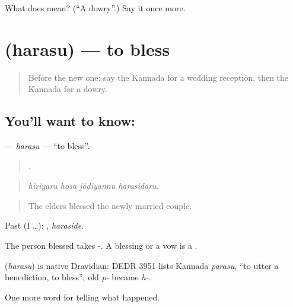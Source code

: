 \begin{tcolorbox}[breakable,colback=teal!4,colframe=teal!35!black,title={Before you move on}]
What does  mean? (\textquotedblleft{}A dowry\textquotedblright{}.) Say it once more.
\end{tcolorbox}
\section[\texorpdfstring{\kn{ಹರಸು} (harasu)}{ಹರಸು (harasu)}]{ (harasu) — to bless}

\label{lesson:KA-C325-harasu}



\begin{quote}
Before the new one: say the Kannada for a wedding reception, then the Kannada for a dowry.
\end{quote}

\subsection*{You'll want to know: }
\textbf{} — \emph{harasu} — \textquotedblleft{}to bless\textquotedblright{}.

\begin{quote}
   .
\end{quote}

\begin{quote}
\emph{hiriyaru hosa jōḍiyannu harasidaru.}
\end{quote}

\begin{quote}
The elders blessed the newly married couple.
\end{quote}

Past (I …): , \emph{haraside}.

The person blessed takes -. A blessing or a vow is a .

\begin{cousinweb}
\textbf{} (\emph{harasu}) is native Dravidian: DEDR 3951 lists Kannada \emph{parasu}, \textquotedblleft{}to utter a benediction, to bless\textquotedblright{}; old \emph{p-} became \emph{h-}.
\end{cousinweb}

\begin{grammarlens}[title={What you've built}]
One more word for telling what happened.
\end{grammarlens}

